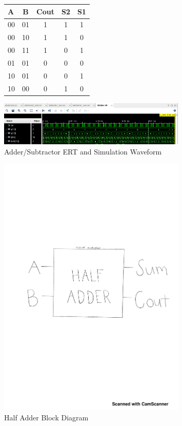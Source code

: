 \documentclass[11pt]{article}
\begin{document}
\begin{figure}\centering
	\begin{tabular}{l|c||c|c|c}
		A & B & Cout & S2 & S1 \\
		\midrule
		00 & 01 & 1 & 1 & 1 \\
		00 & 10 & 1 & 1 & 0 \\
		00 & 11 & 1 & 0 & 1 \\
		01 & 01 & 0 & 0 & 0 \\
		10 & 01 & 0 & 0 & 1 \\
		10 & 00 & 0 & 1 & 0 \\
		\bottomrule
	\end{tabular} 
	
	\includegraphics[width=0.8\textwidth,trim=0cm 0cm 0.3cm 1.5cm,clip]{addersub_simwave1}
	\caption{Adder/Subtractor ERT and Simulation Waveform}
	\label{fig:sim_with_table_SUB}
\end{figure}

\begin{figure}\centering
	\includegraphics[width=0.8\textwidth,trim=0cm 11cm 0cm 9.5cm,clip]{half_adder_block_diagram}
	\caption{Half Adder Block Diagram}
	\label{fig:half_adder_diagram}	
\end{figure}
\end{document}

